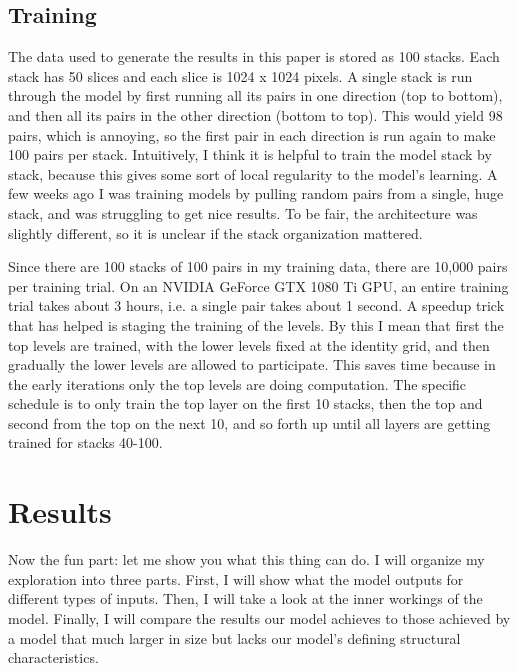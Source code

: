 \documentclass[12pt,a4paper]{article}
\begin{document}
\subsection{Training}

The data used to generate the results in this paper is stored as 100 stacks. Each stack has 50 slices and each slice is 1024 x 1024 pixels. A single stack is run through the model by first running all its pairs in one direction (top to bottom), and then all its pairs in the other direction (bottom to top). This would yield 98 pairs, which is annoying, so the first pair in each direction is run again to make 100 pairs per stack. Intuitively, I think it is helpful to train the model stack by stack, because this gives some sort of local regularity to the model's learning. A few weeks ago I was training models by pulling random pairs from a single, huge stack, and was struggling to get nice results. To be fair, the architecture was slightly different, so it is unclear if the stack organization mattered.

Since there are 100 stacks of 100 pairs in my training data, there are 10,000 pairs per training trial. On an NVIDIA GeForce GTX 1080 Ti GPU, an entire training trial takes about 3 hours, i.e. a single pair takes about 1 second. A speedup trick that has helped is staging the training of the levels. By this I mean that first the top levels are trained, with the lower levels fixed at the identity grid, and then gradually the lower levels are allowed to participate. This saves time because in the early iterations only the top levels are doing computation. The specific schedule is to only train the top layer on the first 10 stacks, then the top and second from the top on the next 10, and so forth up until all layers are getting trained for stacks 40-100.


\newpage



\section{Results}

Now the fun part: let me show you what this thing can do. I will organize my exploration into three parts. First, I will show what the model outputs for different types of inputs. Then, I will take a look at the inner workings of the model. Finally, I will compare the results our model achieves to those achieved by a model that much larger in size but lacks our model's defining structural characteristics.
\end{document}
